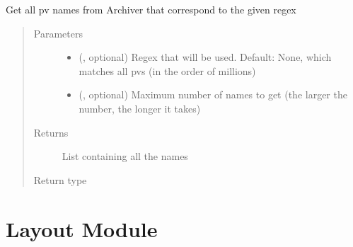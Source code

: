 \documentclass[letterpaper,10pt,english]{sphinxmanual}
\begin{document}
\begin{fulllineitems}
\label{\detokenize{epics_requests:epics_requests.get_names}}
\sphinxAtStartPar
Get all pv names from Archiver that correspond to the given regex
\begin{quote}\begin{description}
\item[{Parameters}] \leavevmode\begin{itemize}
\item {} 
\sphinxAtStartPar
{} (, optional) \textendash{} Regex that will be used. Default: None, which matches all pvs (in the order of millions)

\item {} 
\sphinxAtStartPar
{} (, optional) \textendash{} Maximum number of names to get (the larger the number, the longer it takes)

\end{itemize}

\item[{Returns}] \leavevmode
\sphinxAtStartPar
List containing all the names

\item[{Return type}] \leavevmode
\sphinxAtStartPar
{}

\end{description}\end{quote}

\end{fulllineitems}



\chapter{Layout Module}
\label{\detokenize{layout:module-layout}}\label{\detokenize{layout:layout-module}}\label{\detokenize{layout::doc}}
\end{document}
